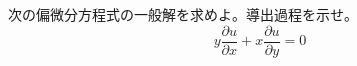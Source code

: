 
次の偏微分方程式の一般解を求めよ。導出過程を示せ。
\[
y\frac{\partial u}{\partial x} + x\frac{\partial u}{\partial y} = 0
\]
